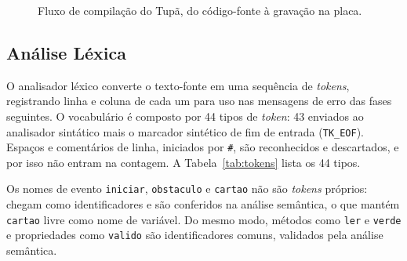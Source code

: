\documentclass[conference]{IEEEtran}
\begin{document}
\begin{figure}[htbp]
\centering
{}
\caption{Fluxo de compilação do Tupã, do código-fonte à gravação na placa.}
\label{fig:pipeline}
\end{figure}

\subsection{Análise Léxica}
O analisador léxico converte o texto-fonte em uma sequência de
\textit{tokens}, registrando linha e coluna de cada um para uso nas
mensagens de erro das fases seguintes. O vocabulário é composto por 44 tipos de
\textit{token}: 43 enviados ao analisador sintático mais o marcador sintético
de fim de entrada (\texttt{TK\_EOF}). Espaços e comentários de linha,
iniciados por \texttt{\#}, são reconhecidos e descartados, e por isso não
entram na contagem. A Tabela~\ref{tab:tokens} lista os 44 tipos.

Os nomes de evento \texttt{iniciar}, \texttt{obstaculo} e \texttt{cartao} não
são \textit{tokens} próprios: chegam como identificadores e são conferidos na
análise semântica, o que mantém \texttt{cartao} livre como nome de variável.
Do mesmo modo, métodos como \texttt{ler} e \texttt{verde} e propriedades como
\texttt{valido} são identificadores comuns, validados pela análise semântica.
\end{document}
